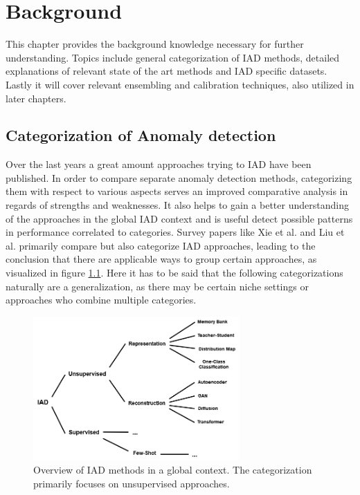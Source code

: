 \chapter{Background}
\label{chap:background}

This chapter provides the background knowledge necessary for further understanding. Topics include general categorization of IAD methods, detailed explanations of relevant 
state of the art methods and IAD specific datasets. Lastly it will cover relevant ensembling and calibration techniques, also utilized in later chapters.

\section{Categorization of Anomaly detection}
\label{sec:IADcategs}
Over the last years a great amount approaches trying to IAD have been published. In order to compare separate anomaly detection methods, categorizing them with respect to various 
aspects serves an improved comparative analysis in regards of strengths and weaknesses. It also helps to gain a better understanding of the approaches in the global IAD context and
is useful detect possible patterns in performance correlated to categories. Survey papers like Xie et al. \cite{Xie_2024benchmarking} and 
Liu et al.
\cite{liu2024deep} primarily compare but also categorize IAD approaches, leading to the conclusion that there are applicable ways to group certain approaches, as 
visualized in figure \ref{fig:IADcategstree}. Here it has to be said that the following categorizations naturally are a generalization, as there may be certain niche settings or approaches who combine multiple categories.

\begin{figure}[ht]
    \centering
    \includegraphics[width=0.7\textwidth]{figures/baumtree.drawio.png}
    \caption{Overview of IAD methods in a global context. The categorization primarily focuses on unsupervised approaches.}
    \label{fig:IADcategstree}
\end{figure}

